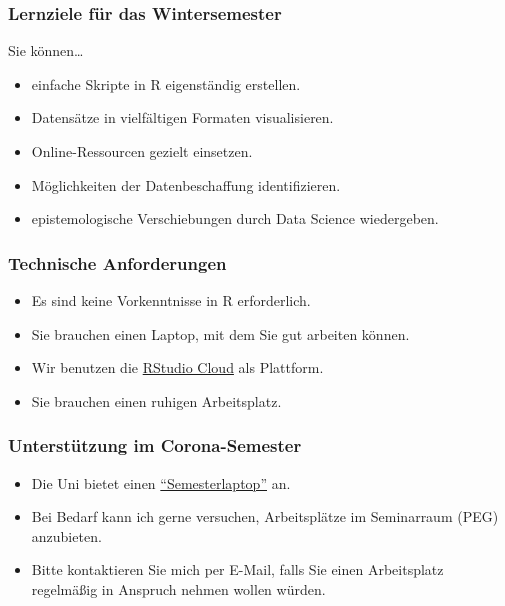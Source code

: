 \documentclass[11pt,german,a4paper]{article}
\providecommand{\tightlist}{%
  \setlength{\itemsep}{0pt}\setlength{\parskip}{0pt}}
\begin{document}
\hypertarget{lernziele-fuxfcr-das-wintersemester}{%
\subsubsection{Lernziele für das Wintersemester}\label{lernziele-fuxfcr-das-wintersemester}}

Sie können\ldots{}

\begin{itemize}
\tightlist
\item
  einfache Skripte in R eigenständig erstellen.
\item
  Datensätze in vielfältigen Formaten visualisieren.
\item
  Online-Ressourcen gezielt einsetzen.
\item
  Möglichkeiten der Datenbeschaffung identifizieren.
\item
  epistemologische Verschiebungen durch Data Science wiedergeben.
\end{itemize}

\hypertarget{technische-anforderungen}{%
\subsubsection{Technische Anforderungen}\label{technische-anforderungen}}

\begin{itemize}
\tightlist
\item
  Es sind keine Vorkenntnisse in R erforderlich.
\item
  Sie brauchen einen Laptop, mit dem Sie gut arbeiten können.
\item
  Wir benutzen die \href{https://rstudio.cloud}{RStudio Cloud} als Plattform.
\item
  Sie brauchen einen ruhigen Arbeitsplatz.
\end{itemize}

\hypertarget{unterstuxfctzung-im-corona-semester}{%
\subsubsection{Unterstützung im Corona-Semester}\label{unterstuxfctzung-im-corona-semester}}

\begin{itemize}
\tightlist
\item
  Die Uni bietet einen \href{https://www.starkerstart.uni-frankfurt.de/92914986/ContentPage_92914986}{``Semesterlaptop''} an.
\item
  Bei Bedarf kann ich gerne versuchen, Arbeitsplätze im Seminarraum (PEG) anzubieten.
\item
  Bitte kontaktieren Sie mich per E-Mail, falls Sie einen Arbeitsplatz regelmäßig in Anspruch nehmen wollen würden.
\end{itemize}
\end{document}
